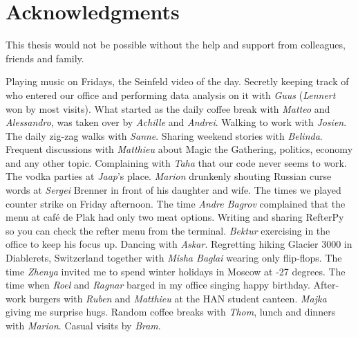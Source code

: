 \manualmark
{}%
%
%
\chapter*{Acknowledgments}%

This thesis would not be possible without the help and support from colleagues, friends and family. 

Playing music on Fridays, the Seinfeld video of the day. Secretly keeping track of who entered our office and performing data analysis on it with \emph{Guus} (\emph{Lennert} won by most visits). What started as the daily coffee break with \emph{Matteo} and \emph{Alessandro}, was taken over by \emph{Achille} and \emph{Andrei}. Walking to work with \emph{Josien}. The daily zig-zag walks with \emph{Sanne}. Sharing weekend stories with \emph{Belinda}. Frequent discussions with \emph{Matthieu} about Magic the Gathering, politics, economy and any other topic. Complaining with \emph{Taha} that our code never seems to work.
The vodka parties at \emph{Jaap}'s place. \emph{Marion} drunkenly shouting Russian curse words at \emph{Sergei} Brenner in front of his daughter and wife. The times we played counter strike on Friday afternoon. The time \emph{Andre Bagrov} complained that the menu at caf\'e de Plak had only two meat options. 
Writing and sharing RefterPy so you can check the refter menu from the terminal. \emph{Bektur} exercising in the office to keep his focus up. Dancing with \emph{Askar}. Regretting hiking Glacier 3000 in Diablerets, Switzerland together with \emph{Misha Baglai} wearing only flip-flops. The time \emph{Zhenya} invited me to spend winter holidays in Moscow at -27 degrees. The time when \emph{Roel} and \emph{Ragnar} barged in my office singing happy birthday. After-work burgers with \emph{Ruben} and \emph{Matthieu} at the HAN student canteen. \emph{Majka} giving me surprise hugs. Random coffee breaks with \emph{Thom}, lunch and dinners with \emph{Marion}. Casual visits by \emph{Bram}. %
